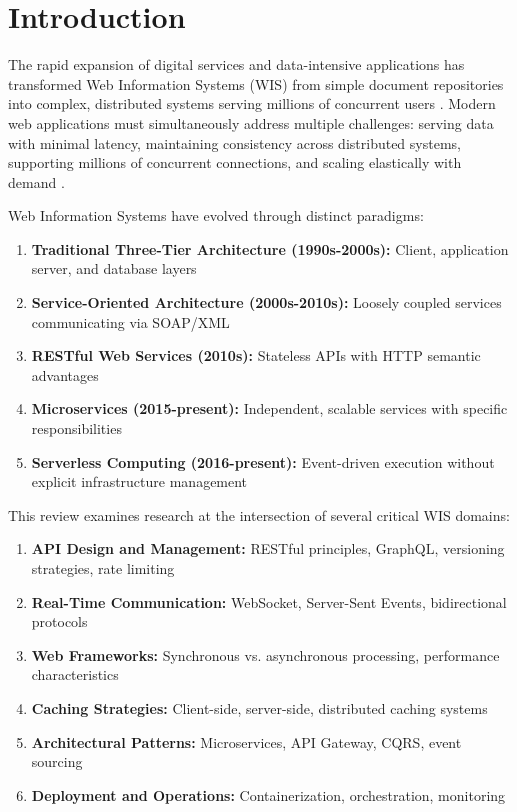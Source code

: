 \documentclass[conference]{IEEEtran}
\begin{document}
\section{Introduction}

The rapid expansion of digital services and data-intensive applications has transformed Web Information Systems (WIS) from simple document repositories into complex, distributed systems serving millions of concurrent users \cite{pressman2014software}. Modern web applications must simultaneously address multiple challenges: serving data with minimal latency, maintaining consistency across distributed systems, supporting millions of concurrent connections, and scaling elastically with demand \cite{newman2015building}.

Web Information Systems have evolved through distinct paradigms:

\begin{enumerate}
    \item \textbf{Traditional Three-Tier Architecture (1990s-2000s):} Client, application server, and database layers
    \item \textbf{Service-Oriented Architecture (2000s-2010s):} Loosely coupled services communicating via SOAP/XML
    \item \textbf{RESTful Web Services (2010s):} Stateless APIs with HTTP semantic advantages
    \item \textbf{Microservices (2015-present):} Independent, scalable services with specific responsibilities
    \item \textbf{Serverless Computing (2016-present):} Event-driven execution without explicit infrastructure management
\end{enumerate}

This review examines research at the intersection of several critical WIS domains:

\begin{enumerate}
    \item \textbf{API Design and Management:} RESTful principles, GraphQL, versioning strategies, rate limiting
    \item \textbf{Real-Time Communication:} WebSocket, Server-Sent Events, bidirectional protocols
    \item \textbf{Web Frameworks:} Synchronous vs. asynchronous processing, performance characteristics
    \item \textbf{Caching Strategies:} Client-side, server-side, distributed caching systems
    \item \textbf{Architectural Patterns:} Microservices, API Gateway, CQRS, event sourcing
    \item \textbf{Deployment and Operations:} Containerization, orchestration, monitoring
\end{enumerate}
\end{document}
